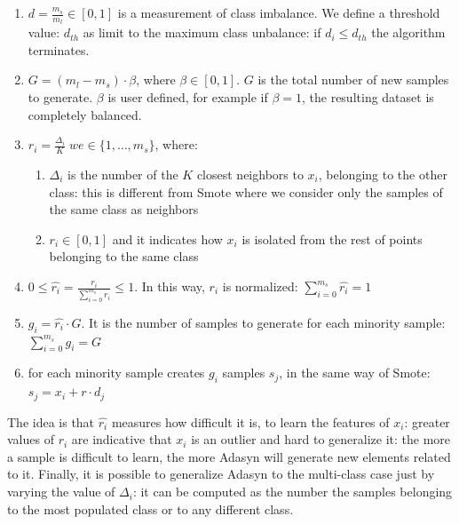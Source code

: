 \documentclass[LaM,binding=0.6cm]{sapthesis}
\begin{document}
\begin{enumerate}
\item $d = \frac{m_s}{m_l} \in [0,1]$ is a measurement of class imbalance. We define a threshold value: $d_{th}$ as limit to the maximum class unbalance: if $d_i\le d_{th}$ the algorithm terminates.
\item $G=(m_l - m_s)\cdot \beta$, where $\beta \in [0,1]$. $G$ is the total number of new samples to generate. $\beta$ is user defined, for example if $\beta=1$, the resulting dataset is completely balanced.
\item $r_i = \frac{\Delta_i}{K} \; we \in \{1,\dots,m_{s}\}$, where:
\begin{enumerate}
\item  $\Delta_i$ is the number of the $K$ closest neighbors to $x_i$, belonging to the other class: this is different from Smote where we consider only the samples of the same class as neighbors
\item $r_i \in [0,1]$ and it indicates how $x_i$ is isolated from the rest of points belonging to the same class
\end{enumerate}
\item $0\leq \hat{r_i}=\frac{r_i}{\sum_{i=0}^{m_s}r_i }\leq 1$. In this way, $r_i$ is normalized: $\sum_{i=0}^{m_s}\hat{r_i} =1$
\item $g_i=\hat{r_i}\cdot G$. It is the number of samples to generate for each minority sample: $\sum_{i=0}^{m_s}g_i =G$ 
\item for each minority sample creates $g_i$ samples $s_j$, in the same way of Smote: $s_j = x_i+r\cdot d_j$
\end{enumerate}
The idea is that $\hat{r_i}$ measures how difficult it is, to learn the features of $x_i$: greater values of $r_i$ are indicative that $x_i$ is an outlier and hard to generalize it: the more a sample is difficult to learn, the more Adasyn will generate new elements related to it. Finally, it is possible to generalize Adasyn to the multi-class case just by varying the value of $\Delta_i$: it can be computed as the number the samples belonging to the most populated class or to any different class.
\end{document}
